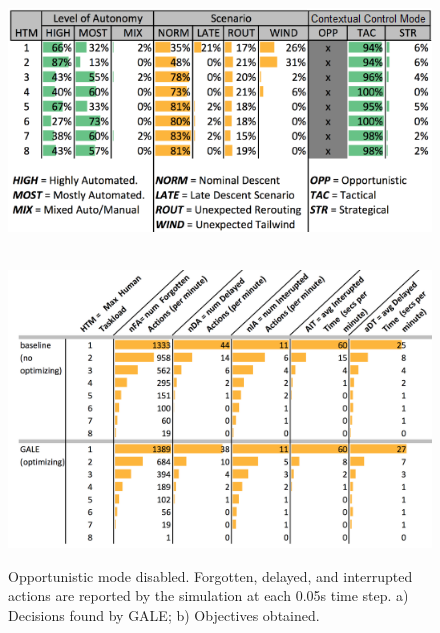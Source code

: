 \documentclass[journal]{IEEEtran}
\begin{document}
\begin{figure}
\begin{center}
\includegraphics[width=4.5in]{figures/GALE,decisions,noOpp}
 
 ~\\


\includegraphics[width=5.25in]{figures/objectives,NoOpp}
 
\end{center}

\caption{Opportunistic mode disabled. 
Forgotten, delayed, and interrupted actions are reported by the simulation at each 0.05s time step. a) Decisions found by GALE; b) Objectives obtained.
}\label{fig:some}
\end{figure}



\end{document}
